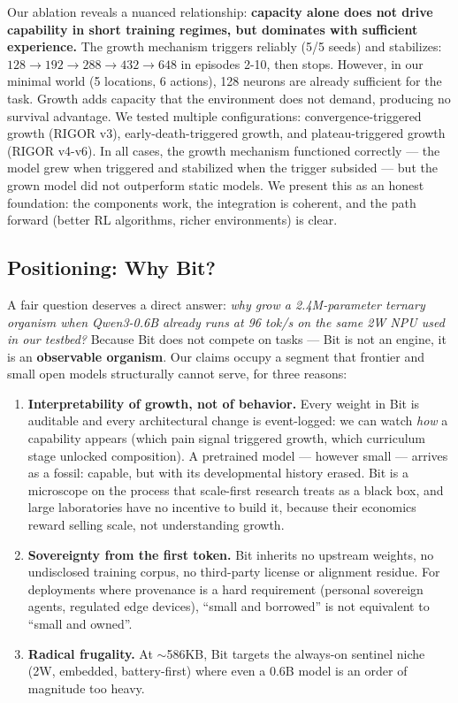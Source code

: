 \documentclass{article}
\begin{document}
Our ablation reveals a nuanced relationship: \textbf{capacity alone does not drive capability in short training regimes, but dominates with sufficient experience.} The growth mechanism triggers reliably (5/5 seeds) and stabilizes: $128\rightarrow192\rightarrow288\rightarrow432\rightarrow648$ in episodes 2-10, then stops. However, in our minimal world (5 locations, 6 actions), 128 neurons are already sufficient for the task. Growth adds capacity that the environment does not demand, producing no survival advantage. We tested multiple configurations: convergence-triggered growth (RIGOR v3), early-death-triggered growth, and plateau-triggered growth (RIGOR v4-v6). In all cases, the growth mechanism functioned correctly --- the model grew when triggered and stabilized when the trigger subsided --- but the grown model did not outperform static models. We present this as an honest foundation: the components work, the integration is coherent, and the path forward (better RL algorithms, richer environments) is clear.

\subsection{Positioning: Why Bit?}
\label{sec:positioning}

A fair question deserves a direct answer: \emph{why grow a 2.4M-parameter ternary organism when Qwen3-0.6B already runs at 96 tok/s on the same 2W NPU used in our testbed?} Because Bit does not compete on tasks --- Bit is not an engine, it is an \textbf{observable organism}. Our claims occupy a segment that frontier and small open models structurally cannot serve, for three reasons:

\begin{enumerate}
	\item \textbf{Interpretability of growth, not of behavior.} Every weight in Bit is auditable and every architectural change is event-logged: we can watch \emph{how} a capability appears (which pain signal triggered growth, which curriculum stage unlocked composition). A pretrained model --- however small --- arrives as a fossil: capable, but with its developmental history erased. Bit is a microscope on the process that scale-first research treats as a black box, and large laboratories have no incentive to build it, because their economics reward selling scale, not understanding growth.
	\item \textbf{Sovereignty from the first token.} Bit inherits no upstream weights, no undisclosed training corpus, no third-party license or alignment residue. For deployments where provenance is a hard requirement (personal sovereign agents, regulated edge devices), ``small and borrowed'' is not equivalent to ``small and owned''.
	\item \textbf{Radical frugality.} At $\sim$586KB, Bit targets the always-on sentinel niche (2W, embedded, battery-first) where even a 0.6B model is an order of magnitude too heavy.
\end{enumerate}
\end{document}
